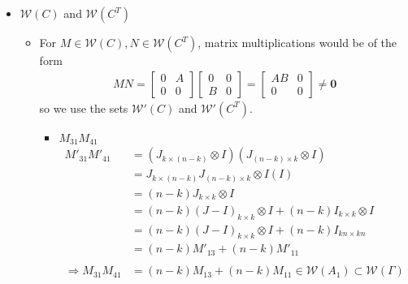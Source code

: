 \documentclass{article}
\begin{document}
\begin{itemize}
    \item $\mathcal{W}(C)$ and $\mathcal{W}(C^T)$ \\
    \begin{itemize}
        \item For $M\in\mathcal{W}(C),N \in \mathcal{W}(C^T)$, matrix multiplications would be of the form \\
        \begin{align*}
            MN = \begin{bmatrix}
                0 & A \\ 0 & 0
            \end{bmatrix}\begin{bmatrix}
                0&0\\B&0
            \end{bmatrix} = \begin{bmatrix}
                AB&0\\0&0
            \end{bmatrix} \neq \mathbf{0}
        \end{align*}
        so we use the sets $\mathcal{W'}(C)$ and $\mathcal{W'}(C^T)$. \\
        \begin{itemize}
            \item $M_{31}M_{41}$
            \begin{align*}
                M'_{31}M'_{41}
                &= (J_{k\times(n-k)}\otimes I)(J_{(n-k)\times k}\otimes I) \\
                &= J_{k\times(n-k)}J_{(n-k)\times k} \otimes I(I) \\
                &= (n-k)J_{k\times k}\otimes I \\
                &= (n-k)(J-I)_{k\times k}\otimes I + (n-k)I_{k\times k}\otimes I \\
                &= (n-k)(J-I)_{k\times k}\otimes I + (n-k)I_{kn\times kn} \\
                &= (n-k)M'_{13} + (n-k)M'_{11} \\\\
                \Rightarrow M_{31}M_{41} &= (n-k)M_{13} + (n-k)M_{11} \in \mathcal{W}(A_1)\subset\mathcal{W}(\Gamma)
            \end{align*}
            

\end{itemize}
\end{itemize}
\end{itemize}
\end{document}

